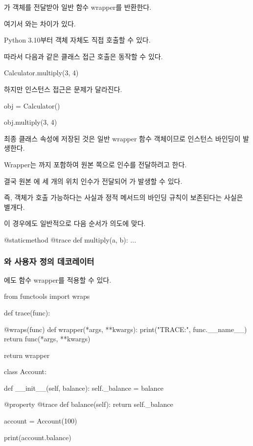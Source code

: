 가  객체를 전달받아 일반 함수 wrapper를 반환한다.

여기서 와는 차이가 있다.

Python 3.10부터  객체 자체도 직접 호출할 수 있다.

따라서 다음과 같은 클래스 접근 호출은 동작할 수 있다.

\begin{dhkcode}
Calculator.multiply(3, 4)
\end{dhkcode}

하지만 인스턴스 접근은 문제가 달라진다.

\begin{dhkcode}
obj = Calculator()

obj.multiply(3, 4)
\end{dhkcode}

최종 클래스 속성에 저장된 것은 일반 wrapper 함수 객체이므로 인스턴스 바인딩이 발생한다.

Wrapper는 까지 포함하여 원본 쪽으로 인수를 전달하려고 한다.

결국 원본 에 세 개의 위치 인수가 전달되어 가 발생할 수 있다.

즉,  객체가 호출 가능하다는 사실과 정적 메서드의 바인딩 규칙이 보존된다는 사실은 별개다.

이 경우에도 일반적으로 다음 순서가 의도에 맞다.

\begin{dhkcode}
@staticmethod
@trace
def multiply(a, b):
    ...
\end{dhkcode}

\subsubsection{와 사용자 정의 데코레이터}

에도 함수 wrapper를 적용할 수 있다.

\begin{dhkcode}
from functools import wraps

def trace(func):

    @wraps(func)
    def wrapper(*args, **kwargs):
        print("TRACE:", func.__name__)
        return func(*args, **kwargs)

    return wrapper


class Account:

    def __init__(self, balance):
        self._balance = balance

    @property
    @trace
    def balance(self):
        return self._balance


account = Account(100)

print(account.balance)
\end{dhkcode}

